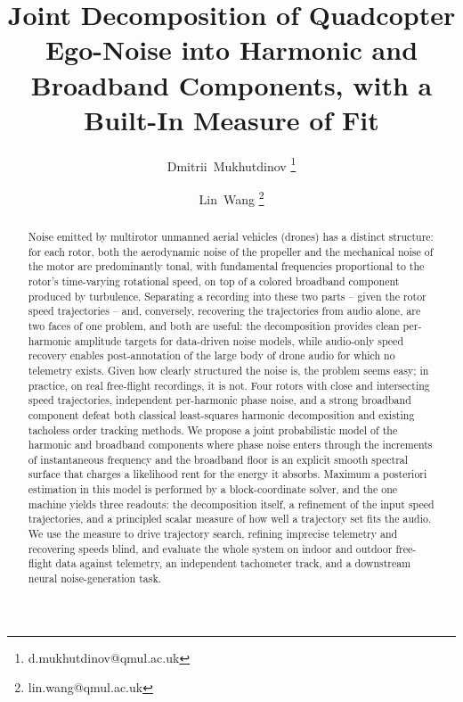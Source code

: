 \documentclass[journal]{IEEEtran}
\begin{document}
\title{Joint Decomposition of Quadcopter Ego-Noise into Harmonic and
  Broadband Components, with a Built-In Measure of Fit}

\author[1]{Dmitrii~Mukhutdinov \thanks{d.mukhutdinov@qmul.ac.uk}}
\author[1]{Lin~Wang \thanks{lin.wang@qmul.ac.uk}}


\maketitle

\begin{abstract}
Noise emitted by multirotor unmanned aerial vehicles (drones) has a
distinct structure: for each rotor, both the aerodynamic noise of the
propeller and the mechanical noise of the motor are predominantly tonal,
with fundamental frequencies proportional to the rotor's time-varying
rotational speed, on top of a colored broadband component produced by
turbulence. Separating a recording into these two parts -- given the
rotor speed trajectories -- and, conversely, recovering the trajectories
from audio alone, are two faces of one problem, and both are useful: the
decomposition provides clean per-harmonic amplitude targets for
data-driven noise models, while audio-only speed recovery enables
post-annotation of the large body of drone audio for which no telemetry
exists. Given how clearly structured the noise is, the problem seems
easy; in practice, on real free-flight recordings, it is not. Four rotors
with close and intersecting speed trajectories, independent per-harmonic phase noise,
and a strong broadband component defeat both classical
least-squares harmonic decomposition and existing tacholess order
tracking methods. We propose a joint probabilistic model of the harmonic
and broadband components where phase noise enters through the increments
of instantaneous frequency and the broadband floor is an explicit smooth
spectral surface that charges a likelihood rent for the energy it absorbs.
Maximum a posteriori estimation in this model is performed by a block-coordinate
solver, and the one machine yields three readouts: the decomposition
itself, a refinement of the input speed trajectories, and a principled
scalar measure of how well a trajectory set fits the audio. We use the
measure to drive trajectory search, refining imprecise telemetry and
recovering speeds blind, and evaluate the whole system on indoor and
outdoor free-flight data against telemetry, an independent tachometer
track, and a downstream neural noise-generation task.
\end{abstract}
\end{document}
